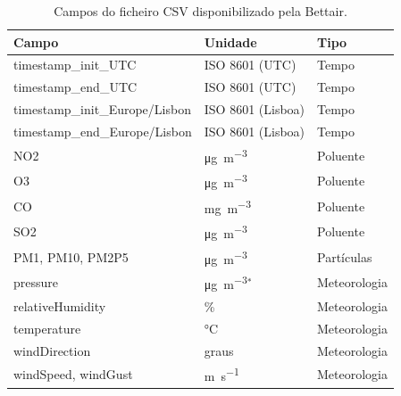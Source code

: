 \begin{table}[htbp]
\centering
\caption{Campos do ficheiro CSV disponibilizado pela Bettair.}
\label{tab:campos}

\small
\renewcommand{\arraystretch}{1.2}

\begin{tabularx}{\textwidth}{
    @{}
    >{\raggedright\arraybackslash}X
    >{\raggedright\arraybackslash}p{}
    >{\raggedright\arraybackslash}p{}
    @{}
}

\toprule
\textbf{Campo} & \textbf{Unidade} & \textbf{Tipo} \\
\midrule

timestamp\_init\_UTC
    & ISO 8601 (UTC) & Tempo \\

timestamp\_end\_UTC
    & ISO 8601 (UTC) & Tempo \\

timestamp\_init\_Europe/Lisbon
    & ISO 8601 (Lisboa) & Tempo \\

timestamp\_end\_Europe/Lisbon
    & ISO 8601 (Lisboa) & Tempo \\

NO2
    & \si{\micro\gram\per\cubic\metre} & Poluente \\

O3
    & \si{\micro\gram\per\cubic\metre} & Poluente \\

CO
    & \si{\milli\gram\per\cubic\metre} & Poluente \\

SO2
    & \si{\micro\gram\per\cubic\metre} & Poluente \\

PM1, PM10, PM2P5
    & \si{\micro\gram\per\cubic\metre} & Partículas \\

pressure
    & \si{\micro\gram\per\cubic\metre}$^{*}$
    & Meteorologia \\

relativeHumidity
    & \% & Meteorologia \\

temperature
    & \si{\celsius} & Meteorologia \\

windDirection
    & graus & Meteorologia \\

windSpeed, windGust
    & \si{\metre\per\second} & Meteorologia \\


\end{tabularx}
\end{table}
